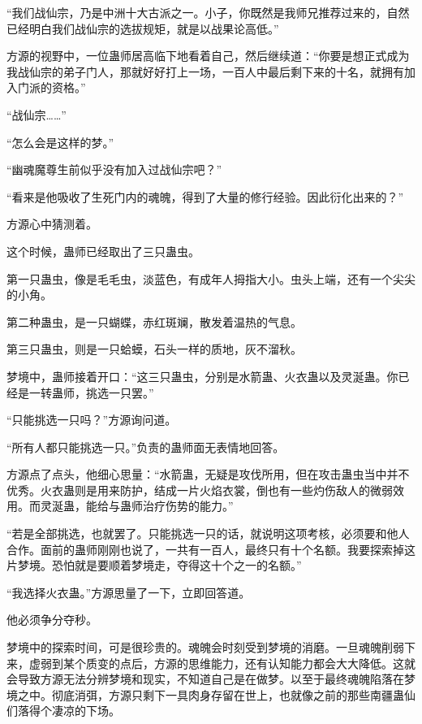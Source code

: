 
\begin{this_body}



“我们战仙宗，乃是中洲十大古派之一。小子，你既然是我师兄推荐过来的，自然已经明白我们战仙宗的选拔规矩，就是以战果论高低。”

方源的视野中，一位蛊师居高临下地看着自己，然后继续道：“你要是想正式成为我战仙宗的弟子门人，那就好好打上一场，一百人中最后剩下来的十名，就拥有加入门派的资格。”

“战仙宗……”

“怎么会是这样的梦。”

“幽魂魔尊生前似乎没有加入过战仙宗吧？”

“看来是他吸收了生死门内的魂魄，得到了大量的修行经验。因此衍化出来的？”

方源心中猜测着。

这个时候，蛊师已经取出了三只蛊虫。

第一只蛊虫，像是毛毛虫，淡蓝色，有成年人拇指大小。虫头上端，还有一个尖尖的小角。

第二种蛊虫，是一只蝴蝶，赤红斑斓，散发着温热的气息。

第三只蛊虫，则是一只蛤蟆，石头一样的质地，灰不溜秋。

梦境中，蛊师接着开口：“这三只蛊虫，分别是水箭蛊、火衣蛊以及灵涎蛊。你已经是一转蛊师，挑选一只罢。”

“只能挑选一只吗？”方源询问道。

“所有人都只能挑选一只。”负责的蛊师面无表情地回答。

方源点了点头，他细心思量：“水箭蛊，无疑是攻伐所用，但在攻击蛊虫当中并不优秀。火衣蛊则是用来防护，结成一片火焰衣裳，倒也有一些灼伤敌人的微弱效用。而灵涎蛊，能给与蛊师治疗伤势的能力。”

“若是全部挑选，也就罢了。只能挑选一只的话，就说明这项考核，必须要和他人合作。面前的蛊师刚刚也说了，一共有一百人，最终只有十个名额。我要探索掉这片梦境。恐怕就是要顺着梦境走，夺得这十个之一的名额。”

“我选择火衣蛊。”方源思量了一下，立即回答道。

他必须争分夺秒。

梦境中的探索时间，可是很珍贵的。魂魄会时刻受到梦境的消磨。一旦魂魄削弱下来，虚弱到某个质变的点后，方源的思维能力，还有认知能力都会大大降低。这就会导致方源无法分辨梦境和现实，不知道自己是在做梦。以至于最终魂魄陷落在梦境之中。彻底消弭，方源只剩下一具肉身存留在世上，也就像之前的那些南疆蛊仙们落得个凄凉的下场。


\end{this_body}
